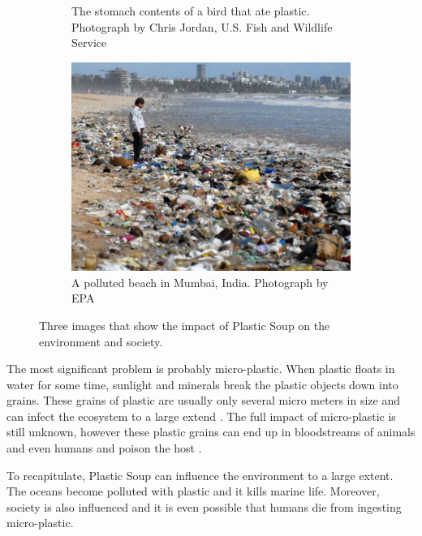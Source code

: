 \begin{figure}
\begin{minipage}{\widefigwidth}
\begin{subfigure}[t]{.48\textwidth}
	\caption{The stomach contents of a bird that ate plastic. Photograph by Chris Jordan, U.S. Fish and Wildlife Service }
	\label{fig:plastic-bird}
   \end{subfigure}
   \hfill
   \begin{subfigure}[t]{.48\textwidth}
    \ifx\showfig\undefined
	 \includegraphics[keepaspectratio=true,width=\textwidth]{images/plastic-beach.jpg} \fi
	\caption{A polluted beach in Mumbai, India. Photograph by EPA }
	\label{fig:plastic-beach}
   \end{subfigure}
   \caption{Three images that show the impact of Plastic Soup on the environment and society.}%
   \label{fig:plastic-impact}
   \end{minipage}
\end{figure}

The most significant problem is probably micro-plastic.
When plastic floats in water for some time, sunlight and minerals break the plastic objects down into grains.
These grains of plastic are usually only several micro meters in size and can infect the ecosystem to a large extend \citep{moore2011plastic}.
The full impact of micro-plastic is still unknown, however these plastic grains can end up in bloodstreams of animals and even humans and poison the host \citep{von2012uptake}.

To recapitulate, Plastic Soup can influence the environment to a large extent.
The oceans become polluted with plastic and it kills marine life. Moreover, society is also influenced and it is even possible that humans die from ingesting micro-plastic.

